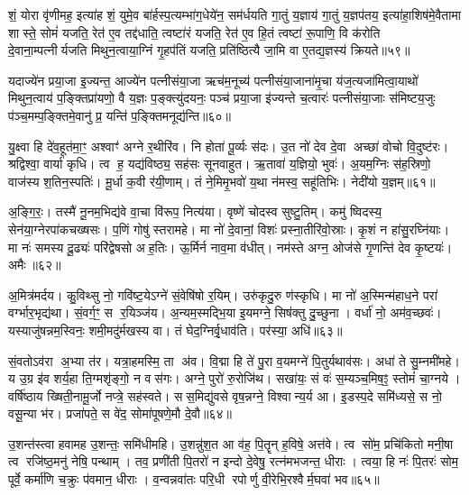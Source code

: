 शं॒ योरा वृ॑णीमह॒ इत्या॑ह शं॒ युमे॒व बा॑र्\mbox{}हस्प॒त्यम्भा॑ग॒धेये॑न॒ सम॑र्धयति गा॒तुं य॒ज्ञाय॑ गा॒तुं य॒ज्ञप॑तय॒ इत्या॑हा॒शिष॑मे॒वैतामा शास्ते॒ सोमं॑ यजति॒ रेत॑ ए॒व तद्द॑धाति॒ त्वष्टा॑रं यजति॒ रेत॑ ए॒व हि॒तं त्वष्टा॑ रू॒पाणि॒ वि क॑रोति दे॒वाना॒म्पत्नीर्यजति मिथुन॒त्वाया॒ग्निं गृ॒हप॑तिं यजति॒ प्रति॑ष्ठित्यै जा॒मि वा ए॒तद्य॒ज्ञस्य॑ क्रियते॥५९॥

यदाज्ये॑न प्रया॒जा इ॒ज्यन्त॒ आज्ये॑न पत्नीसंया॒जा ऋच॑म॒नूच्य॑ पत्नीसंया॒जाना॑मृ॒चा य॑ज॒त्यजा॑मित्वा॒याथो॑ मिथुन॒त्वाय॑ प॒ङ्क्तिप्रा॑यणो॒ वै य॒ज्ञः प॒ङ्क्त्यु॑दयनः॒ पञ्च॑ प्रया॒जा इ॑ज्यन्ते च॒त्वारः॑ पत्नीसंया॒जाः स॑मिष्टय॒जुः प॑ञ्च॒मम्प॒ङ्क्तिमे॒वानु॑ प्र॒ यन्ति॑ प॒ङ्क्तिमनूद्य॑न्ति॥६०॥

{\anuvakamend[{प्र॒जायाः करोति॒ तत्क्रि॑यते॒ त्रय॑स्त्रिशच्च॥10॥}]}

यु॒क्ष्वा हि दे॑व॒हूत॑मा॒ꣳ॒ अश्वाꣳ॑ अग्ने र॒थीरि॑व। नि होता॑ पू॒र्व्यः स॑दः। उ॒त नो॑ देव दे॒वा अच्छा॑ वोचो वि॒दुष्ट॑रः। श्रद्विश्वा॒ वार्या॑ कृधि। त्व ह॒ यद्य॑विष्ठ्य॒ सह॑सः सूनवाहुत। ऋ॒तावा॑ य॒ज्ञियो॒ भुवः॑। अ॒यम॒ग्निः स॑ह॒स्रिणो॒ वाज॑स्य श॒तिन॒स्पतिः॑। मू॒र्धा क॒वी र॑यी॒णाम्। तं ने॒मिमृ॒भवो॑ य॒था न॑मस्व॒ सहू॑तिभिः। नेदी॑यो य॒ज्ञम्॥६१॥

अ॒ङ्गि॒रः॒। तस्मै॑ नू॒नम॒भिद्य॑वे वा॒चा वि॑रूप॒ नित्य॑या। वृष्णे॑ चोदस्व सुष्टु॒तिम्। कमु॑ ष्विदस्य॒ सेन॑या॒ग्नेरपा॑कचख्षसः। प॒णिं गोषु॑ स्तरामहे। मा नो॑ दे॒वानां॒ विशः॑ प्रस्ना॒तीरि॑वो॒स्राः। कृ॒शं न हा॑सु॒रघ्नि॑याः। मा नः॑ समस्य दू॒ढ्यः॑ परि॑द्वेषसो अह॒तिः। ऊ॒र्मिर्न नाव॒मा व॑धीत्। नम॑स्ते अग्न॒ ओज॑से गृ॒णन्ति॑ देव कृ॒ष्टयः॑। अमैः॥६२॥

अ॒मित्र॑मर्दय। कु॒विथ्सु नो॒ गवि॑ष्ट॒येऽग्ने॑ सं॒वेषि॑षो र॒यिम्। उरु॑कृदु॒रु ण॑स्कृधि। मा नो॑ अ॒स्मिन्म॑हाध॒ने परा॑ वर्ग्भार॒भृद्य॑था। सं॒वर्ग॒ꣳ॒ स र॒यिञ्ज॑य। अ॒न्यम॒स्मद्भि॒या इ॒यमग्ने॒ सिष॑क्तु दु॒च्छुना। वर्धा॑ नो॒ अम॑व॒च्छवः॑। यस्याजु॑षन्नम॒स्विनः॒ शमी॒मदु॑र्मखस्य वा। तं घेद॒ग्निर्वृ॒धाव॑ति। पर॑स्या॒ अधि॑॥६३॥

सं॒वतोऽव॑रा अ॒भ्या त॑र। यत्रा॒हमस्मि॒ ता अ॑व। वि॒द्मा हि ते॑ पु॒रा व॒यमग्ने॑ पि॒तुर्यथाव॑सः। अधा॑ ते सु॒म्नमी॑महे। य उ॒ग्र इ॑व शर्य॒हा ति॒ग्मशृ॑ङ्गो॒ न वस॑गः। अग्ने॒ पुरो॑ रु॒रोजि॑थ। सखा॑यः॒ सं वः॑ स॒म्यञ्च॒मिष॒ꣵ॒ स्तोमं॑ चा॒ग्नये। वर्\mbox{}षि॑ष्ठाय ख्षिती॒नामू॒र्जो नप्त्रे॒ सह॑स्वते। सस॒मिद्यु॑वसे वृष॒न्नग्ने॒ विश्वान्य॒र्य आ। इ॒डस्प॒दे समि॑ध्यसे॒ स नो॒ वसू॒न्या भ॑र। प्रजा॑पते॒ स वे॑द॒ सोमा॑पूषणे॒मौ दे॒वौ॥६४॥

{\anuvakamend[{य॒ज्ञममै॒रधि॑ वृष॒न्नेका॒न्नविꣳ॑श॒तिश्च॑॥11॥}]}

उ॒शन्त॑स्त्वा हवामह उ॒शन्तः॒ समि॑धीमहि। उ॒शन्नु॑श॒त आ व॑ह॒ पि॒तॄन् ह॒विषे॒ अत्त॑वे। त्व सो॑म॒ प्रचि॑कितो मनी॒षा त्व रजि॑ष्ठ॒मनु॑ नेषि॒ पन्थाम्। तव॒ प्रणी॑ती पि॒तरो॑ न इन्दो दे॒वेषु॒ रत्न॑मभजन्त॒ धीराः। त्वया॒ हि नः॑ पि॒तरः॑ सोम॒ पूर्वे॒ कर्मा॑णि च॒क्रुः प॑वमान॒ धीराः। व॒न्वन्नवा॑तः परि॒धी रपोर्णु वी॒रेभि॒रश्वैर्म॒घवा॑ भव॥६५॥

